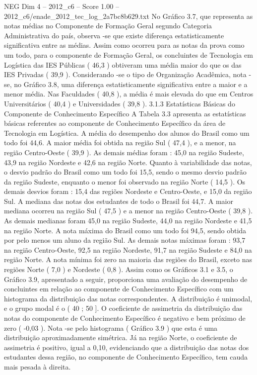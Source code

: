 \begin{textsample}{NEG Dim 4 – 2012\_c6 – Score 1.00 – 2012\_c6/enade\_2012\_tec\_log\_2a7bc8b629.txt}
No Gráfico 3.7, que representa as notas médias no Componente de Formação Geral segundo Categoria Administrativa do país, observa -se que existe diferença estatisticamente significativa entre as médias.
Assim como ocorreu para as notas da prova como um todo, para o componente de Formação Geral, os concluintes de Tecnologia em Logística das IES Públicas ( 46,3 ) obtiveram uma média maior do que os das IES Privadas ( 39,9 ).
Considerando -se o tipo de Organização Acadêmica, nota -se, no Gráfico 3.8, uma diferença estatisticamente significativa entre a maior e a menor média.
Nas Faculdades ( 40,8 ), a média é mais elevada do que em Centros Universitários ( 40,4 ) e Universidades ( 39,8 ). 3.1.3 Estatísticas Básicas do Componente de Conhecimento Específico A Tabela 3.3 apresenta as estatísticas básicas referentes ao componente de Conhecimento Específico da área de Tecnologia em Logística.
A média do desempenho dos alunos do Brasil como um todo foi 44,6.
A maior média foi obtida na região Sul ( 47,4 ), e a menor, na região Centro-Oeste ( 39,9 ).
As demais médias foram : 45,0 na região Sudeste, 43,9 na região Nordeste e 42,6 na região Norte.
Quanto à variabilidade das notas, o desvio padrão do Brasil como um todo foi 15,5, sendo o mesmo desvio padrão da região Sudeste, enquanto o menor foi observado na região Norte ( 14,5 ).
Os demais desvios foram : 15,4 das regiões Nordeste e Centro-Oeste, e 15,0 da região Sul.
A mediana das notas dos estudantes de todo o Brasil foi 44,7.
A maior mediana ocorreu na região Sul ( 47,5 ) e a menor na região Centro-Oeste ( 39,8 ).
As demais medianas foram 45,0 na região Sudeste, 44,0 na região Nordeste e 41,5 na região Norte.
A nota máxima do Brasil como um todo foi 94,5, sendo obtida por pelo menos um aluno da região Sul.
As demais notas máximas foram : 93,7 na região Centro-Oeste, 92,5 na região Nordeste, 91,7 na região Sudeste e 84,0 na região Norte.
A nota mínima foi zero na maioria das regiões do Brasil, exceto nas regiões Norte ( 7,0 ) e Nordeste ( 0,8 ).
Assim como os Gráficos 3.1 e 3.5, o Gráfico 3.9, apresentado a seguir, proporciona uma avaliação do desempenho de concluintes em relação ao componente de Conhecimento Específico com um histograma da distribuição das notas correspondentes.
A distribuição é unimodal, e o grupo modal é o ( 40 ; 50 ].
O coeficiente de assimetria da distribuição das notas do componente de Conhecimento Específico é negativo e bem próximo de zero ( -0,03 ).
Nota -se pelo histograma ( Gráfico 3.9 ) que esta é uma distribuição aproximadamente simétrica.
Já na região Norte, o coeficiente de assimetria é positivo, igual a 0,10, evidenciando que a distribuição das notas dos estudantes dessa região, no componente de Conhecimento Específico, tem cauda mais pesada à direita.

\end{textsample}
